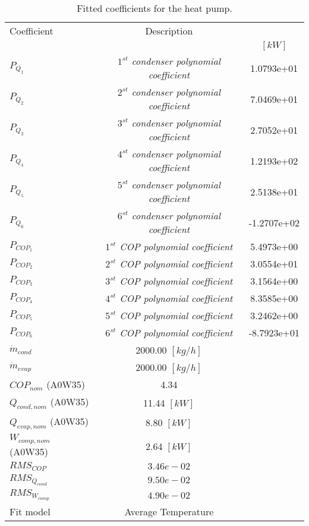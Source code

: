 \documentclass[english]{SPFShortReport}
\author{Dani Carbonell}
\begin{document}
\begin{table}[!ht]
\begin{small}
\caption{Fitted coefficients for the heat pump.}
\begin{center}
\resizebox{12cm}{!} 
{
\begin{tabular}{l | c c } 
\hline
\hline
Coefficient &Description & \\ 
 & &$[kW]$\\ 
\hline
$P_{Q_{1}}$ & \emph{$1^{st}$ condenser polynomial coefficient}  & 1.0793e+01    \\ 
$P_{Q_{2}}$ & \emph{$2^{st}$ condenser polynomial coefficient}  & 7.0469e+01    \\ 
$P_{Q_{3}}$ & \emph{$3^{st}$ condenser polynomial coefficient}  & 2.7052e+01    \\ 
$P_{Q_{4}}$ & \emph{$4^{st}$ condenser polynomial coefficient}  & 1.2193e+02    \\ 
$P_{Q_{5}}$ & \emph{$5^{st}$ condenser polynomial coefficient}  & 2.5138e+01    \\ 
$P_{Q_{6}}$ & \emph{$6^{st}$ condenser polynomial coefficient}  & -1.2707e+02    \\ 
\hline
$P_{COP_{1}}$ & \emph{$1^{st}$ COP polynomial coefficient}  & 5.4973e+00    \\ 
$P_{COP_{2}}$ & \emph{$2^{st}$ COP polynomial coefficient}  & 3.0554e+01    \\ 
$P_{COP_{3}}$ & \emph{$3^{st}$ COP polynomial coefficient}  & 3.1564e+00    \\ 
$P_{COP_{4}}$ & \emph{$4^{st}$ COP polynomial coefficient}  & 8.3585e+00    \\ 
$P_{COP_{5}}$ & \emph{$5^{st}$ COP polynomial coefficient}  & 3.2462e+00    \\ 
$P_{COP_{6}}$ & \emph{$6^{st}$ COP polynomial coefficient}  & -8.7923e+01    \\ 
\hline
$\dot m_{cond}$ & 2000.00 $[kg/h]$ \\ 
$\dot m_{evap}$ & 2000.00 $[kg/h]$ \\ 
\hline
$COP_{nom}$ (A0W35)& 4.34 \\ 
$Q_{cond,nom}$ (A0W35)& 11.44 $[kW]$\\ 
$Q_{evap,nom}$ (A0W35)& 8.80 $[kW]$\\ 
$W_{comp,nom}$ (A0W35)& 2.64 $[kW]$\\ 
\hline
 $RMS_{COP}$ & $3.46e-02$ \\ 
 $RMS_{Q_{cond}}$ & $9.50e-02$ \\ 
 $RMS_{W_{comp}}$ & $4.90e-02$ \\ 
\hline
Fit model & Average Temperature\\ 
\hline
\hline
\end{tabular}
}
\label{CoefTable}
\end{center}
\end{small}
\end{table}
\end{document}
